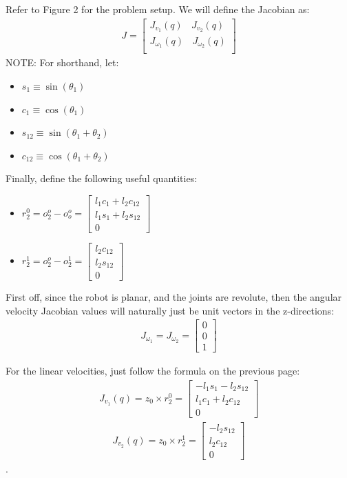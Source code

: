 \documentclass[../../master-handout.tex]{subfiles}
\begin{document}
Refer to Figure 2 for the problem setup. We will define the Jacobian as:
\begin{align*}
    J = \begin{bmatrix}
    J_{v_1}(q) \ \ \ \ J_{v_2}(q) \\
    J_{\omega_1}(q) \ \ \ \ J_{\omega_2}(q) \\
    \end{bmatrix}
\end{align*}
NOTE: For shorthand, let:
\begin{itemize}
    \item $s_1 \equiv \sin(\theta_1)$
    \item $c_1 \equiv \cos(\theta_1)$
    \item $s_{12} \equiv \sin(\theta_1 + \theta_2)$
    \item $c_{12} \equiv \cos(\theta_1 + \theta_2)$
\end{itemize}
Finally, define the following useful quantities:
\begin{itemize}
    \item $r_2^0 = o_2^o - o_o^o = \begin{bmatrix}
        l_1c_1 + l_2c_{12} \\ l_1s_1 + l_2s_{12} \\ 0 
    \end{bmatrix}$
    \item $r_2^1 = o_2^o - o_2^1 = \begin{bmatrix}
        l_2c_{12} \\l_2s_{12} \\ 0 
    \end{bmatrix}$
\end{itemize}

First off, since the robot is planar, and the joints are revolute, then the angular velocity Jacobian values will naturally just be unit vectors in the z-directions:
\begin{align*}
    J_{\omega_1} = J_{\omega_2} = \begin{bmatrix}
        0 \\ 0 \\ 1
    \end{bmatrix}
\end{align*}

For the linear velocities, just follow the formula on the previous page:
\begin{align*}
    J_{v_1}(q) = z_0 \times r_2^0 = \begin{bmatrix}
        -l_1s_1 - l_2s_{12} \\ l_1c_1 + l_2c_{12} \\ 0
    \end{bmatrix}
\end{align*}
\begin{align*}
    J_{v_2}(q) = z_0 \times r_2^1 = \begin{bmatrix}
        - l_2s_{12} \\ l_2c_{12} \\ 0
    \end{bmatrix}
\end{align*}.
\end{document}
